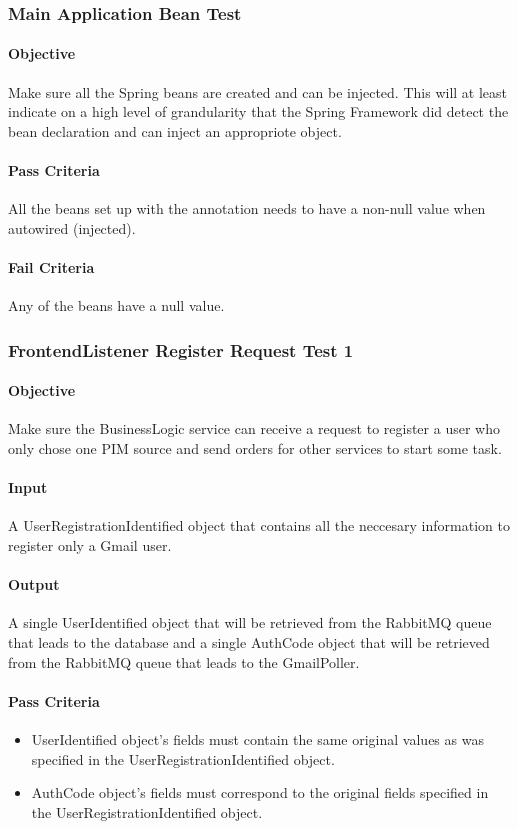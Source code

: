 \documentclass[hidelinks,english]{article}
\begin{document}
			\subsubsection{Main Application Bean Test}\label{businessapplicationbeanstest}
				\paragraph{Objective} Make sure all the Spring beans are created and can be injected. This will at least indicate on a high level of grandularity that the Spring Framework did detect the bean declaration and can inject an appropriote object.
				\paragraph{Pass Criteria} All the beans set up with the \emph{\@Bean} annotation needs to have a non-null value when autowired (injected).
				\paragraph{Fail Criteria} Any of the beans have a null value.
		
			\subsubsection{FrontendListener Register Request Test 1}\label{businessfrontendlistenerregistertest1}
				\paragraph{Objective} Make sure the BusinessLogic service can receive a request to register a user who only chose one PIM source and send orders for other services to start some task.
				\paragraph{Input} A UserRegistrationIdentified object that contains all the neccesary information to register only a Gmail user.
				\paragraph{Output} A single UserIdentified object that will be retrieved from the RabbitMQ queue that leads to the database and a single AuthCode object that will be retrieved from the RabbitMQ queue that leads to the GmailPoller.
				\paragraph{Pass Criteria}
				\begin{itemize}
					\item UserIdentified object's fields must contain the same original values as was specified in the UserRegistrationIdentified object.
					\item AuthCode object's fields must correspond to the original fields specified in the UserRegistrationIdentified object.
				\end{itemize}
\end{document}
